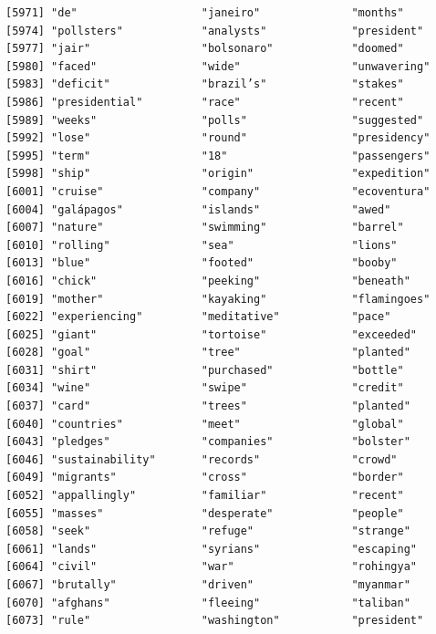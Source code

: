 \documentclass[
  letterpaper,
  DIV=11,
  numbers=noendperiod]{scrartcl}
\begin{document}
\begin{verbatim}
[5971] "de"                   "janeiro"              "months"              
[5974] "pollsters"            "analysts"             "president"           
[5977] "jair"                 "bolsonaro"            "doomed"              
[5980] "faced"                "wide"                 "unwavering"          
[5983] "deficit"              "brazil’s"             "stakes"              
[5986] "presidential"         "race"                 "recent"              
[5989] "weeks"                "polls"                "suggested"           
[5992] "lose"                 "round"                "presidency"          
[5995] "term"                 "18"                   "passengers"          
[5998] "ship"                 "origin"               "expedition"          
[6001] "cruise"               "company"              "ecoventura"          
[6004] "galápagos"            "islands"              "awed"                
[6007] "nature"               "swimming"             "barrel"              
[6010] "rolling"              "sea"                  "lions"               
[6013] "blue"                 "footed"               "booby"               
[6016] "chick"                "peeking"              "beneath"             
[6019] "mother"               "kayaking"             "flamingoes"          
[6022] "experiencing"         "meditative"           "pace"                
[6025] "giant"                "tortoise"             "exceeded"            
[6028] "goal"                 "tree"                 "planted"             
[6031] "shirt"                "purchased"            "bottle"              
[6034] "wine"                 "swipe"                "credit"              
[6037] "card"                 "trees"                "planted"             
[6040] "countries"            "meet"                 "global"              
[6043] "pledges"              "companies"            "bolster"             
[6046] "sustainability"       "records"              "crowd"               
[6049] "migrants"             "cross"                "border"              
[6052] "appallingly"          "familiar"             "recent"              
[6055] "masses"               "desperate"            "people"              
[6058] "seek"                 "refuge"               "strange"             
[6061] "lands"                "syrians"              "escaping"            
[6064] "civil"                "war"                  "rohingya"            
[6067] "brutally"             "driven"               "myanmar"             
[6070] "afghans"              "fleeing"              "taliban"             
[6073] "rule"                 "washington"           "president"           

\end{verbatim}
\end{document}

